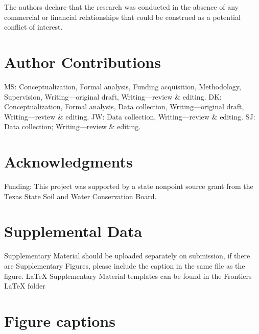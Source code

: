 \documentclass[utf8]{FrontiersinHarvard}
\begin{document}
The authors declare that the research was conducted in the absence of any
commercial or financial relationships that could be construed as a potential
conflict of interest.

\hypertarget{author-contributions}{%
\section*{Author Contributions}\label{author-contributions}}

MS: Conceptualization, Formal analysis, Funding acquisition, Methodology, Supervision, Writing---original draft, Writing---review \& editing.
DK: Conceptualization, Formal analysis, Data collection, Writing---original draft, Writing---review \& editing.
JW: Data collection, Writing---review \& editing.
SJ: Data collection; Writing---review \& editing.

\hypertarget{acknowledgments}{%
\section*{Acknowledgments}\label{acknowledgments}}

Funding: This project was supported by a state nonpoint source grant from the Texas State Soil and Water Conservation Board.

\hypertarget{supplemental-data}{%
\section*{Supplemental Data}\label{supplemental-data}}

Supplementary Material should be uploaded separately on submission, if there are
Supplementary Figures, please include the caption in the same file as the
figure. LaTeX Supplementary Material templates can be found in the Frontiers
LaTeX folder




\hypertarget{figure-captions}{%
\section*{Figure captions}\label{figure-captions}}
\end{document}
